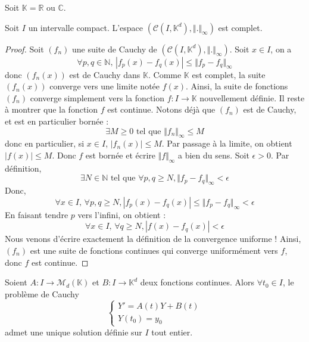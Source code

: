 





  Soit $\mathbb{K} = \mathbb{R}$ ou $\mathbb{C}$.

  \begin{lemma}
    Soit $I$ un intervalle compact. L'espace $(\mathcal{C} (I, \mathbb{K}^d), \Vert . \Vert_{\infty})$ est complet.
  \end{lemma}

  \begin{proof}
    Soit $(f_n)$ une suite de Cauchy de $(\mathcal{C} (I, \mathbb{K}^d), \Vert . \Vert_{\infty})$. Soit $x \in I$, on a
    \[ \forall p, q \in \mathbb{N}, \, |f_p(x) - f_q(x)| \leq \Vert f_p - f_q \Vert_\infty \]
    donc $(f_n(x))$ est de Cauchy dans $\mathbb{K}$. Comme $\mathbb{K}$ est complet, la suite $(f_n(x))$ converge vers une limite notée $f(x)$. Ainsi, la suite de fonctions $(f_n)$ converge simplement vers la fonction $f : I \rightarrow \mathbb{K}$ nouvellement définie. Il reste à montrer que la fonction $f$ est continue.
    \newpar
    Notons déjà que $(f_n)$ est de Cauchy, et est en particulier bornée :
    \[ \exists M \geq 0 \text{ tel que } \Vert f_n \Vert_\infty \leq M \]
    donc en particulier, si $x \in I$, $|f_n(x)| \leq M$. Par passage à la limite, on obtient $|f(x)| \leq M$. Donc $f$ est bornée et écrire $\Vert f \Vert_{\infty}$ a bien du sens.
    \newpar
    Soit $\epsilon > 0$. Par définition,
    \[ \exists N \in \mathbb{N} \text{ tel que } \forall p, q \geq N, \Vert f_p - f_q \Vert_\infty < \epsilon \]
    Donc,
    \[ \forall x \in I, \, \forall p, q \geq N, |f_p(x) - f_q(x)| \leq \Vert f_p - f_q \Vert_\infty < \epsilon \]
    En faisant tendre $p$ vers l'infini, on obtient :
    \[ \forall x \in I, \, \forall q \geq N, |f(x) - f_q(x)| < \epsilon \]
    Nous venons d'écrire exactement la définition de la convergence uniforme ! Ainsi, $(f_n)$ est une suite de fonctions continues qui converge uniformément vers $f$, donc $f$ est continue.
  \end{proof}


  \begin{theorem}
    Soient $A : I \rightarrow \mathcal{M}_d(\mathbb{K})$ et $B : I \rightarrow \mathbb{K}^d$ deux fonctions continues. Alors $\forall t_0 \in I$, le problème de Cauchy
    \[ \begin{cases} Y' = A(t)Y + B(t) \\ Y(t_0) = y_0 \end{cases} \tag{$C$} \]
    admet une unique solution définie sur $I$ tout entier.
  \end{theorem}

